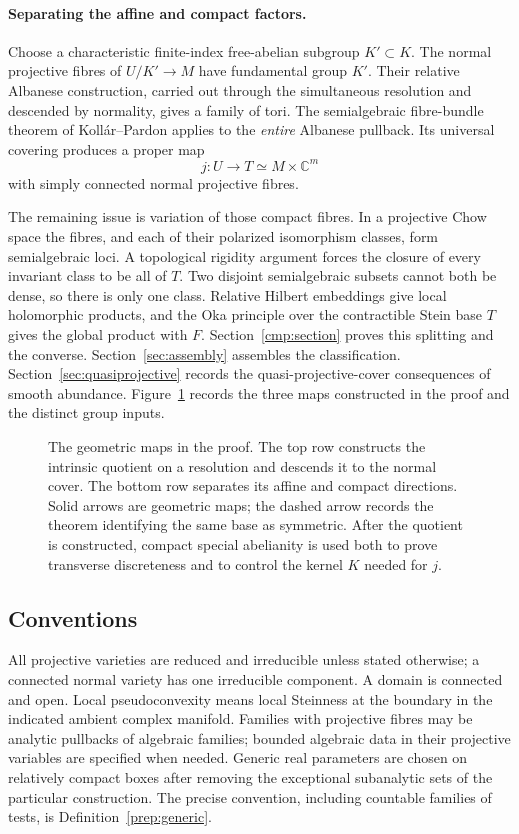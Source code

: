 \documentclass[11pt]{article}
\theoremstyle{definition}
\theoremstyle{remark}
\newcommand{\C}{\mathbb C}
\begin{document}
\paragraph{Separating the affine and compact factors.}
Choose a characteristic finite-index free-abelian subgroup
\(K'\subset K\). The normal projective fibres of \(U/K'\to M\)
have fundamental group \(K'\). Their relative Albanese construction,
carried out through the simultaneous resolution and descended by
normality, gives a family of tori. The semialgebraic fibre-bundle
theorem of Koll\'ar--Pardon applies to the \emph{entire} Albanese
pullback. Its universal covering produces a proper map
\[
                  j:U\longrightarrow T\simeq M\times\C^m
\]
with simply connected normal projective fibres.

The remaining issue is variation of those compact fibres. In a
projective Chow space the fibres, and each of their polarized
isomorphism classes, form semialgebraic loci. A topological rigidity
argument forces the closure of every invariant class to be all of
\(T\). Two disjoint semialgebraic subsets cannot both be dense, so
there is only one class.
Relative Hilbert embeddings give local holomorphic products, and
the Oka principle over the contractible Stein base \(T\) gives the
global product with \(F\). Section~\ref{cmp:section} proves this
splitting and the converse. Section~\ref{sec:assembly} assembles the
classification. Section~\ref{sec:quasiprojective} records the
quasi-projective-cover consequences of smooth abundance.
Figure~\ref{fig:classification} records the three
maps constructed in the proof and the distinct group inputs.

\begin{figure}[htbp]
\centering

\caption{The geometric maps in the proof. The top row constructs the
intrinsic quotient on a resolution and descends it to the normal
cover. The bottom row separates its affine and compact directions.
Solid arrows are geometric maps; the dashed arrow records the
theorem identifying the same base as symmetric. After the quotient
is constructed, compact special abelianity is used both to prove
transverse discreteness and to control the kernel \(K\) needed for \(j\).}
\label{fig:classification}
\end{figure}

\subsection{Conventions}
All projective varieties are reduced and irreducible unless stated
otherwise; a connected normal variety has one irreducible component.
A domain is connected and open. Local pseudoconvexity means local
Steinness at the boundary in the indicated ambient complex manifold.
Families with projective fibres may be analytic pullbacks of algebraic
families; bounded algebraic data in their projective variables are
specified when needed. Generic real parameters are chosen on relatively
compact boxes after removing the exceptional subanalytic sets of the
particular construction. The precise convention, including countable
families of tests, is Definition~\ref{prep:generic}.
\end{document}
